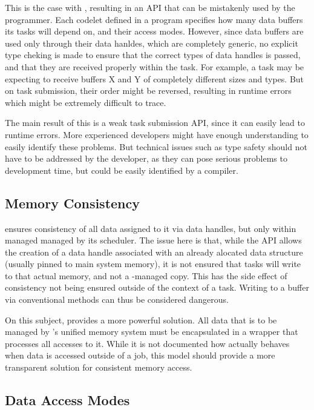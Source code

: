 \documentclass[main.tex]{subfiles}
\begin{document}
This is the case with \starpu, resulting in an API that can be mistakenly used by the programmer. Each codelet defined in a program specifies how many data buffers its tasks will depend on, and their access modes. However, since data buffers are used only through their data hanldes, which are completely generic, no explicit type cheking is made to ensure that the correct types of data handles is passed, and that they are received properly within the task. For example, a task may be expecting to receive buffers X and Y of completely different sizes and types. But on task submission, their order might be reversed, resulting in runtime errors which might be extremely difficult to trace.

The main result of this is a weak task submission API, since it can easily lead to runtime errors. More experienced developers might have enough understanding to easily identify these problems. But technical issues such as type safety should not have to be addressed by the developer, as they can pose serious problems to development time, but could be easily identified by a compiler.

\subsection{Memory Consistency}

\starpu ensures consistency of all data assigned to it via data handles, but only within managed managed by its scheduler. The issue here is that, while the API allows the creation of a data handle associated with an already alocated data structure (usually pinned to main system memory), it is not ensured that tasks will write to that actual memory, and not a \starpu-managed copy. This has the side effect of consistency not being ensured outside of the context of a task. Writing to a buffer via conventional methods can thus be considered dangerous.

On this subject, \gama provides a more powerful solution. All data that is to be managed by \gama's unified memory system must be encapsulated in a wrapper that processes all accesses to it. While it is not documented how \gama actually behaves when data is accessed outside of a job, this model should provide a more transparent solution for consistent memory access.


\subsection{Data Access Modes}
\end{document}
